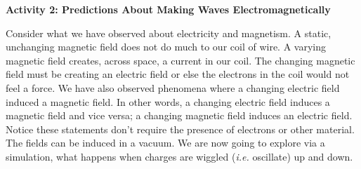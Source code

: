 \textbf{Activity 2: Predictions About Making Waves Electromagnetically}

Consider what we have observed about electricity and magnetism.
A static, unchanging magnetic field does not do much to our coil of wire.
A varying magnetic field creates, across space, a current in our coil.
The changing magnetic field must be creating an electric field or else the electrons
in the coil would not feel a force.
We have also observed phenomena where a changing electric field induced a magnetic
field.
In other words, a changing electric field induces a magnetic field and vice versa;
a changing magnetic field induces an electric field.
Notice these statements don't require the presence of electrons or other material.
The fields can be induced in a vacuum.
We are now going to explore via a simulation, what happens when  charges are wiggled
({\it i.e.} oscillate) up and down.

